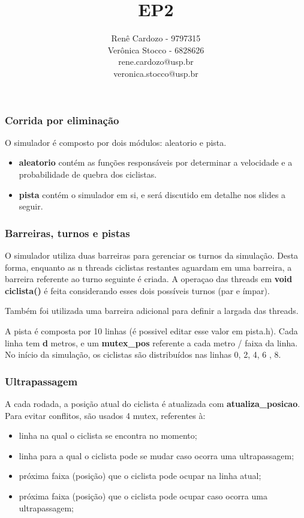 \documentclass{beamer}
\author{Renê Cardozo - 9797315 \\ 
        Verônica Stocco - 6828626 \\
        rene.cardozo@usp.br \\
        veronica.stocco@usp.br}
\title{EP2}
\institute{Instituto de Matemática e Estatística \\
Universidade de São Paulo}
\date{}
\begin{document}
\frame{\titlepage}

\begin{frame}

\frametitle{Corrida por eliminação}

O simulador é composto por dois módulos: aleatorio e pista. 
\begin{itemize}
\item \textbf{aleatorio} contém as funções responsáveis por determinar a velocidade e a probabilidade de quebra dos ciclistas.

\item \textbf{pista} contém o simulador em si, e será discutido em detalhe nos slides a seguir.

\end{itemize}
\end{frame}


\begin{frame}
\frametitle{Barreiras, turnos e pistas}

O simulador utiliza duas barreiras para gerenciar os turnos da simulação. Desta forma, enquanto as n threads ciclistas restantes aguardam em uma barreira, a barreira referente ao turno seguinte é criada. A operaçao das threads em \textbf{void ciclista()} é feita considerando esses dois possíveis turnos (par e ímpar).

Também foi utilizada uma barreira adicional para definir a largada das threads.

A pista é composta por 10 linhas (é possivel editar esse valor em pista.h). Cada linha tem \textbf{d} metros, e um \textbf{mutex\_pos} referente a cada metro / faixa da linha.  No início da simulação, os ciclistas são distribuídos nas linhas 0, 2, 4, 6 , 8.

\end{frame}



\begin{frame}
\frametitle{Ultrapassagem}

A cada rodada, a posição atual do ciclista é atualizada com \textbf{atualiza\_posicao}. Para evitar conflitos, são usados 4 mutex, referentes à:

\begin{itemize}
\item linha na qual o ciclista se encontra no momento;
\item linha para a qual o ciclista pode se mudar caso ocorra uma ultrapassagem;
\item próxima faixa (posição) que o ciclista pode ocupar na linha atual;
\item próxima faixa (posição) que o ciclista pode ocupar caso ocorra uma ultrapassagem;
\end{itemize}

\end{frame}
\end{document}
